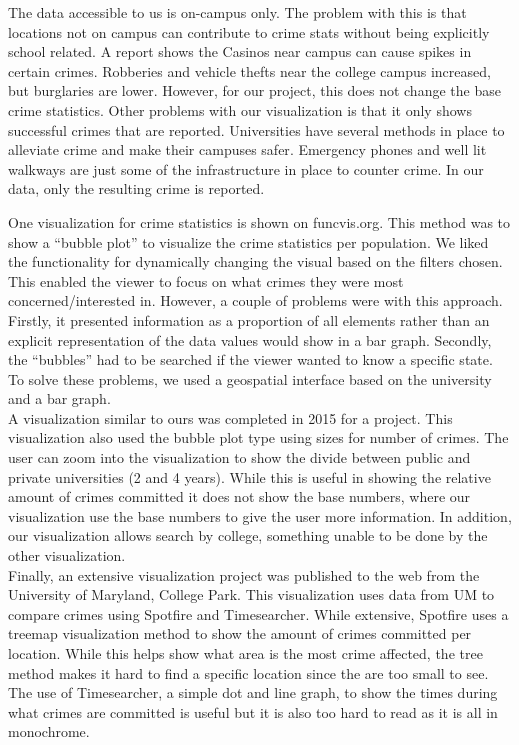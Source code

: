 \documentclass[journal]{vgtc}                %
\begin{document}
The data accessible to us is on-campus only. The problem with this is that locations not on campus can contribute to crime stats without being explicitly school related.  A report shows the Casinos near campus can cause spikes in certain crimes.  Robberies and vehicle thefts near the college campus increased, but burglaries are lower\cite{Thomas:2011:CRIME}.  However, for our project, this does not change the base crime statistics.
Other problems with our visualization is that it only shows successful crimes that are reported.  Universities have several methods in place to alleviate crime and make their campuses safer\cite{doi:10.1177/0193841X13509815}.  Emergency phones and well lit walkways are just some of the infrastructure in place to counter crime.  In our data, only the resulting crime is reported.

One visualization for crime statistics is shown on funcvis.org\cite{kogan_2013}.  This method was to show a ``bubble plot'' to visualize the crime statistics per population.  We liked the functionality for dynamically changing the visual based on the filters chosen.  This enabled the viewer to focus on what crimes they were most concerned/interested in.  However, a couple of problems were with this approach.  Firstly, it presented information as a proportion of all elements rather than an explicit representation of the data values would show in a bar graph.  Secondly, the ``bubbles'' had to be searched if the viewer wanted to know a specific state.  To solve these problems, we used a geospatial interface based on the university and a bar graph.\\
A visualization similar to ours was completed in 2015 for a project\cite{holloway-2015}.  This visualization also used the bubble plot type using sizes for number of crimes.  The user can zoom into the visualization to show the divide between public and private universities (2 and 4 years).  While this is useful in showing the relative amount of crimes committed it does not show the base numbers, where our visualization use the base numbers to give the user more information.  In addition, our visualization allows search by college, something unable to be done by the other visualization.\\
Finally, an extensive visualization project was published to the web from the University of Maryland, College Park\cite{cho-liu-2009}.  This visualization uses data from UM to compare crimes using Spotfire and Timesearcher.  While extensive, Spotfire uses a treemap visualization method to show the amount of crimes committed per location.  While this helps show what area is the most crime affected, the tree method makes it hard to find a specific location since the are too small to see.  The use of Timesearcher, a simple dot and line graph, to show the times during what crimes are committed is useful but it is also too hard to read as it is all in monochrome.\\
\end{document}
